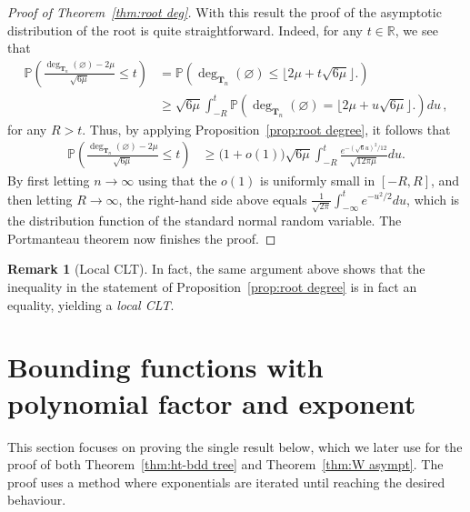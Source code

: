 \documentclass{article}
\newcommand{\pr}{\mathbb{P}}								%
\newcommand{\Prob}[1]{\pr\left(#1\right)}					%
\newcommand{\1}{\mathbbm{1}}								%
\theoremstyle{definition}
\newtheorem{remark}[theorem]{Remark}
\numberwithin{equation}{section}
\newcommand{\bT}{\mathbf T}
\newcommand{\R}{\mathbb R}
\begin{document}
\begin{proof}[Proof of Theorem~\ref{thm:root deg}]
    With this result the proof of the asymptotic distribution of the root is quite straightforward.
    Indeed, for any $t\in\R$, we see that
    \begin{align*}
        \Prob{\frac{\deg_{\bT_n}(\varnothing)-2\mu}{\sqrt{6\mu}}\leq t}
        &=\Prob{\deg_{\bT_n}(\varnothing)\leq\lfloor2\mu+t\sqrt{6\mu}\rfloor\Big.}\\
        &\geq\sqrt{6\mu}\int_{-R}^t\Prob{\deg_{\bT_n}(\varnothing)=\lfloor2\mu+u\sqrt{6\mu}\rfloor\Big.}du\,,
    \end{align*}
    for any $R>t$. 
    Thus, by applying Proposition~\ref{prop:root degree}, it follows that
    \begin{align*}
        \Prob{\frac{\deg_{\bT_n}(\varnothing)-2\mu}{\sqrt{6\mu}}\leq t}
        &\geq\big(1+o(1)\big)\sqrt{6\mu}\int_{-R}^t\frac{e^{-(\sqrt{6}u)^2/12}}{\sqrt{12\pi\mu}}du.
    \end{align*}
    By first letting $n \to \infty$ using that the $o(1)$ is uniformly small in $[-R,R]$, and then letting $R \to \infty$, the right-hand side above equals $\frac{1}{\sqrt{2\pi}}\int_{-\infty}^te^{-u^2/2}du$, which is the distribution function of the standard normal random variable. The Portmanteau theorem now finishes the proof.
\end{proof}

\begin{remark}[Local CLT]
    In fact, the same argument above shows that the inequality in the statement of Proposition~\ref{prop:root degree} is in fact an equality, yielding a \emph{local CLT}. 
\end{remark}

\medskip


\newpage

\appendix



\section{Bounding functions with polynomial factor and exponent}\label{sec:func_poly_fac}

This section focuses on proving the single result below, which we later use for the proof of both Theorem~\ref{thm:ht-bdd tree} and Theorem~\ref{thm:W asympt}.
The proof uses a method where exponentials are iterated until reaching the desired behaviour.
\end{document}
